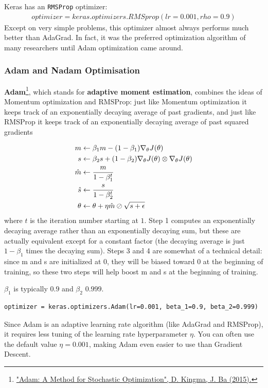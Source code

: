 \documentclass[12pt, letterpaper]{article}
\theoremstyle{definition}
\DeclarePairedDelimiter\autobracket{(}{)}
\newcommand{\br}[1]{\autobracket*{#1}}
\let\tb\textbf
\let\cd\lstinline
\begin{document}
Keras has an \cd+RMSProp+ optimizer:
\begin{equation}
\begin{aligned}
optimizer = keras.optimizers.RMSprop(lr=0.001, rho=0.9)
\end{aligned}
\end{equation}
Except on very simple problems, this optimizer almost always performs much better than AdaGrad. In fact, it was the preferred optimization algorithm of many researchers until Adam optimization came around.

\subsubsection{Adam and Nadam Optimisation}
\tb{Adam}\footnote{\href{https://homl.info/59}{"Adam: A Method for Stochastic Optimization", D. Kingma, J. Ba (2015).}}, which stands for \tb{adaptive moment estimation}, combines the ideas of Momentum optimization and RMSProp: just like Momentum optimization it keeps track of an exponentially decaying average of past gradients, and just like RMSProp it keeps track of an exponentially decaying average of past squared gradients 

\begin{equation}
\begin{aligned}
m &\leftarrow \beta_1 m - \br{1-\beta_1} \nabla_\theta J(\theta)\\
s &\leftarrow \beta_2 s + (1-\beta_2) \nabla_\theta J(\theta) \otimes \nabla_\theta J(\theta)\\
\hat{m} &\leftarrow\frac{m}{1-\beta_1^t}\\
\hat{s} &\leftarrow\frac{s}{1-\beta_2^t}\\
\theta &\leftarrow \theta + \eta \hat{m} \oslash \sqrt{s+\epsilon}
\end{aligned}
\label{eq:Adam}
\end{equation}
where $t$ is the iteration number starting at $1$. Step 1 computes an exponentially decaying average rather than an exponentially decaying sum, but these are actually equivalent except for a constant factor (the decaying average is just $1 - \beta_1$ times the decaying sum). Steps 3 and 4 are somewhat of a technical detail: since m and s are initialized at 0, they will be biased toward 0 at the beginning of training, so these two steps will help boost m and s at the beginning of training.

$\beta_1$ is typically $0.9$ and $\beta_2$ $0.999$.

\begin{lstlisting}
optimizer = keras.optimizers.Adam(lr=0.001, beta_1=0.9, beta_2=0.999)
\end{lstlisting}
Since Adam is an adaptive learning rate algorithm (like AdaGrad and RMSProp), it requires less tuning of the learning rate hyperparameter $\eta$. You can often use the default value $\eta = 0.001$, making Adam even easier to use than Gradient Descent.
\end{document}
